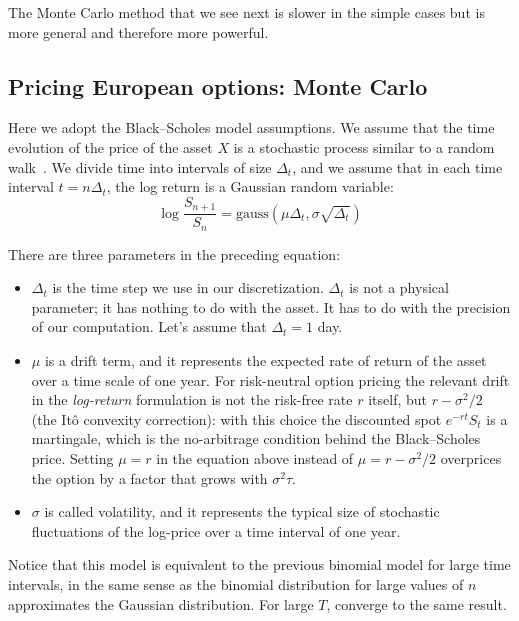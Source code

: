 \documentclass[justified, sixbynine]{tufte-book}
\theoremstyle{plain}%
\newtheorem * {corollary}{Corollary}
\theoremstyle{definition}
\theoremstyle{remark}
\newtheorem * {remark}{Remark}
\newtheorem * {note}{Note}
\begin{document}
\begin{fullwidth}
The Monte Carlo method that we see next is slower in the simple cases but is
more general and therefore more powerful.

\goodbreak\subsection{Pricing European options: Monte Carlo}

Here we adopt the Black--Scholes model assumptions.
We assume that the time evolution of the price of the asset $X$ is
a stochastic process similar to a random walk~\cite{shreve}. We divide time into
intervals of size $\Delta _t$, and we assume that in each time interval $%
t=n\Delta _t$, the log return is a Gaussian random variable:
\begin{equation}
\log \frac{S_{n+1}}{S_n} = \textrm{gauss}(\mu\Delta_t, \sigma\sqrt{\Delta_t}) \label{BS}
\end{equation}

There are three parameters in the preceding equation:

\begin{itemize}
\item  $\Delta _t$ is the time step we use in our discretization. $\Delta _t$
is not a physical parameter; it has nothing to do with the asset. It has to
do with the precision of our computation. Let's assume that $\Delta _t=1$ day.

\item  $\mu $ is a drift term, and it represents the expected rate of return
of the asset over a time scale of one year. For risk-neutral option pricing the relevant drift in the {\it log-return} formulation is not the risk-free rate $r$ itself, but $r - \sigma^2/2$ (the It\^o convexity correction): with this choice the discounted spot $e^{-rt}S_t$ is a martingale, which is the no-arbitrage condition behind the Black--Scholes price. Setting $\mu = r$ in the equation above instead of $\mu = r - \sigma^2/2$ overprices the option by a factor that grows with $\sigma^2 \tau$.

\item  $\sigma $ is called volatility, and it represents the typical size of
stochastic fluctuations of the log-price over a time interval of one year.
\end{itemize}

Notice that this model is equivalent to the previous binomial model for large time intervals, in the same sense as the binomial distribution for large values of $n$ approximates the Gaussian distribution. For large $T$, converge to the same result.


\end{fullwidth}
\end{document}
